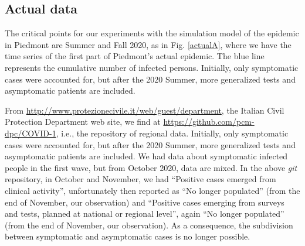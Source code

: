 \documentclass[graybox]{svmult}
\begin{document}
\subsection{Actual data}
\label{actual}

The critical points for our experiments with the simulation model of the epidemic in Piedmont are Summer and Fall 2020, as in Fig. \ref{actualA}, where we have the time series of the first part of Piedmont's actual epidemic. The blue line represents the cumulative number of infected persons. Initially, only symptomatic cases were accounted for, but after the 2020 Summer, more generalized tests and asymptomatic patients are included. 

From \href{http://www.protezionecivile.it/web/guest/department}{http://www.protezionecivile.it/web/guest/department}, the Italian Civil Protection Department web site, we find at \href{https://github.com/pcm-dpc/COVID-19}{https://github.com/pcm-dpc/COVID-1}, i.e., the repository of regional data. Initially, only symptomatic cases were accounted for, but after the 2020 Summer, more generalized tests and asymptomatic patients are included. We had data about symptomatic infected people in the first wave, but from October 2020, data are mixed. In the above \emph{git} repository, in October and November, we had ``Positive cases emerged from clinical activity'', unfortunately then reported as ``No longer populated'' (from the end of November, our observation) and ``Positive cases emerging from surveys and tests, planned at national or regional level'', again ``No longer populated'' (from the end of November, our observation). As a consequence, the subdivision between symptomatic and asymptomatic cases is no longer possible.
\end{document}
